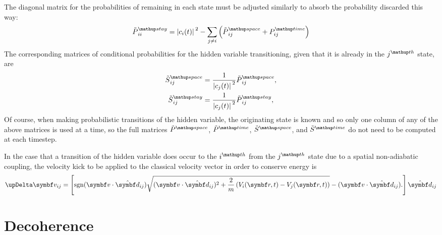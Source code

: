 The diagonal matrix for the probabilities of remaining in each state must be adjusted similarly to absorb the probability discarded this way:
\begin{align}
\tilde P^\up{stay}_{ii} = 
\abs{c_i(t)}^2 - \sum_{j\neq i}\left(\tilde P^\up{space}_{ij} + P^\up{time}_{ij}\right)
\end{align}
The corresponding matrices of conditional probabilities for the hidden variable transitioning, given that it is already in the $j^\up{th}$ state, are
\begin{align}\label{eq:tilde_S_space}
\tilde S^\up{space}_{ij} &= \frac1{\abs{c_j(t)}^2} \tilde P^\up{space}_{ij},\\
\tilde S^\up{stay}_{ij} &= \frac1{\abs{c_j(t)}^2} \tilde P^\up{stay}_{ij},
\end{align}
Of course, when making probabilistic transitions of the hidden variable, the originating state is known and so only one column of any of the above matrices is used at a time, so the full matrices $\tilde P^\up{space}$, $\tilde P^\up{time}$, $\tilde S^\up{space}$, and $\tilde S^\up{time}$ do not need to be computed at each timestep.

In the case that a transition of the hidden variable does occur to the $i^\up{th}$ from the $j^\up{th}$ state due to a spatial non-adiabatic coupling, the velocity kick to be applied to the classical velocity vector in order to conserve energy is
\begin{align}\label{eq:velocity_jump}
\upDelta \vec v_{ij} = \left[\sgn(\vec v\cdot \hat{\vec d}_{ij})
\sqrt{(\vec v\cdot \hat{\vec d}_{ij})^2 + \frac2m\left(V_i(\vec r, t) - V_j(\vec r, t)\right)} - (\vec v\cdot \hat{\vec d}_{ij}).
\right]\hat{\vec d}_{ij}
\end{align}   

\section{Decoherence}\label{sec:decoherence}

